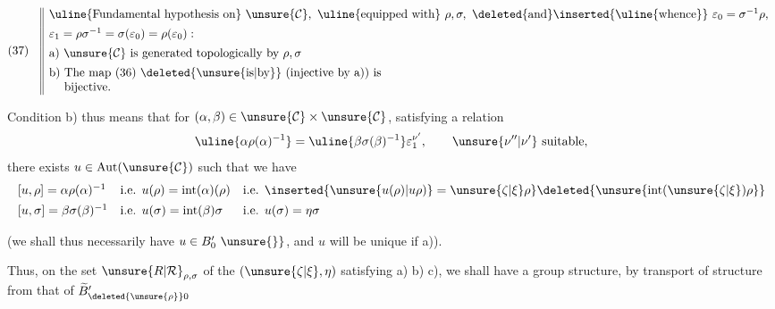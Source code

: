 
\[
(37)\quad
\begin{array}{||l}
\text{\uline{Fundamental hypothesis on} }\unsure{\mathcal{C}},\ 
\text{\uline{equipped with} }\rho,\sigma,\ 
\text{\deleted{and}\inserted{\uline{whence}} }\varepsilon_0=\sigma^{-1}\rho,\\[1ex]
\varepsilon_1=\rho\sigma^{-1}=\sigma(\varepsilon_0)=\rho(\varepsilon_0):\\[1ex]
\text{a) }\unsure{\mathcal{C}}\text{ is generated topologically by }\rho,\sigma\\[1ex]
\text{b) The map (36) \deleted{\unsure{is|by}} (injective by a)) is}\\
\text{\phantom{b) }bijective.}
\end{array}
\]


Condition b) thus means that for
$(\alpha,\beta)\in\unsure{\mathcal{C}}\times\unsure{\mathcal{C}}$,
satisfying a relation
\[
\uline{\alpha\rho(\alpha)^{-1}}
=\uline{\beta\sigma(\beta)^{-1}}\varepsilon_1^{\nu'},
\qquad \unsure{\nu''|\nu'}\text{ suitable},
\]
there exists $u\in\operatorname{Aut}(\unsure{\mathcal{C}})$ such that we have
\[
\begin{array}{lll}
[u,\rho]=\alpha\rho(\alpha)^{-1}&
\text{i.e. }u(\rho)=\operatorname{int}(\alpha)(\rho)&
\text{i.e. }\inserted{\unsure{u(\rho)|u\rho)}=\unsure{\zeta|\xi}\rho}
\deleted{\unsure{\operatorname{int}(\unsure{\zeta|\xi})\rho}}\\[1ex]
[u,\sigma]=\beta\sigma(\beta)^{-1}&
\text{i.e. }u(\sigma)=\operatorname{int}(\beta)\sigma&
\text{i.e. }u(\sigma)=\eta\sigma
\end{array}
\]

\margin{$\unsure{\bullet}$}
(we shall thus necessarily have $u\in B'_0\ \unsure{\}}$, and
$u$ will be unique if  a)).

Thus, on the set  $\unsure{R|\mathcal{R}}_{\rho,\sigma}$ of the $(\unsure{\zeta|\xi},\eta)$ satisfying
a) b) c), we shall have a group structure, \unsure{+|and}  by transport of structure from that of
$\widetilde{B}'_{\deleted{\unsure{\rho}}0}$


